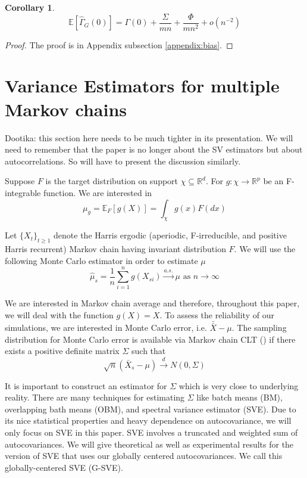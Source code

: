 \documentclass[11pt]{article}
\newtheorem{corollary}{Corollary}
\theoremstyle{remark}
\begin{document}
\begin{corollary} \label{cor:lag0_expectation}
\[
\mathbb{E}[\hat{\Gamma}_{G}(0)] = \Gamma(0) + \dfrac{\Sigma}{mn} + \dfrac{\Phi}{mn^2} + o(n^{-2})
\]
\end{corollary}

\begin{proof}
 The proof is in Appendix subsection \ref{appendix:bias}.
\end{proof}


\section{Variance Estimators for multiple Markov chains} \label{sec:variance_est}

{\color{blue}Dootika: this section here needs to be much tighter in its presentation. We will need to remember that the paper is no longer about the SV estimators but about autocorrelations. So will have to present the discussion similarly. }


  Suppose $F$ is the target distribution on support $\chi \subseteq \mathbb{R}^d$. For $g:\chi \longrightarrow \mathbb{R}^p$ be an F-integrable function. We are interested in
%
\[
\mu_g = \mathbb{E}_F[g(X)] = \int_{\chi}g(x)F(dx)
\]
 
Let $\{X_{t}\}_{t \geq 1}$ denote the Harris ergodic (aperiodic, F-irreducible, and positive Harris recurrent) Markov chain having invariant distribution $F$. We will use the following Monte Carlo estimator in order to estimate $\mu$
%
\[
\hat{\mu}_s = \dfrac{1}{n}\sum_{i = 1}^{n} g(X_{si}) \xrightarrow{a.s.} \mu \textrm{ as } n \to \infty
\]

We are interested in Markov chain average and therefore, throughout this paper, we will deal with the function $g(X) = X$. To assess the reliability of our simulations, we are interested in Monte Carlo error, i.e. $\bar{\bar{X}} - \mu$. The sampling distribution for Monte Carlo error is available via Markov chain CLT (\cite{jones2004markov}) if there exists a positive definite matrix $\Sigma$ such that
%
\[
\sqrt{n}(\bar{X}_s-\mu) \xrightarrow{d} N(0,\Sigma)
\]

 It is important to construct an estimator for $\Sigma$ which is very close to underlying reality. There are many techniques for estimating $\Sigma$ like batch means (BM), overlapping bath means (OBM), and spectral variance estimator (SVE). Due to its nice statistical properties and heavy dependence on autocovariance, we will only focus on SVE in this paper. SVE involves a truncated and weighted sum of autocovariances. We will give theoretical as well as experimental results for the version of SVE that uses our globally centered autocovariances. We call this globally-centered SVE (G-SVE). 
 
\end{document}
